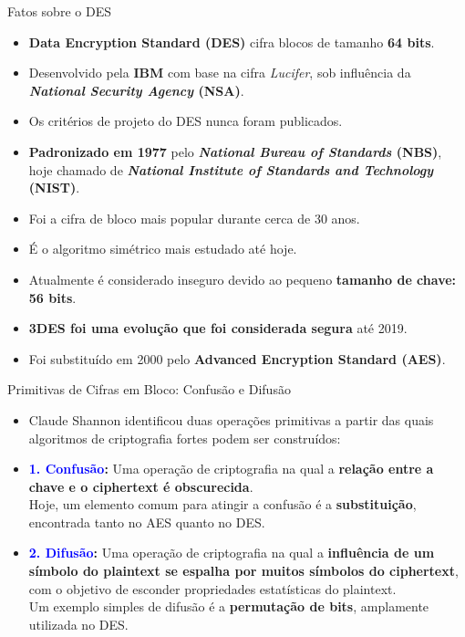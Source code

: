 \documentclass{beamer}
\begin{document}
\begin{frame}{Fatos sobre o DES}

\begin{itemize}
    \item \textbf{Data Encryption Standard (DES)} cifra blocos de tamanho \textbf{64 bits}.
    \item Desenvolvido pela \textbf{IBM} com base na cifra \textit{Lucifer}, sob influência da \textbf{\textit{National Security Agency} (NSA)}. 
    \item Os critérios de projeto do DES nunca foram publicados.
    \item \textbf{Padronizado em 1977} pelo \textbf{\textit{National Bureau of Standards} (NBS)}, hoje chamado de \textbf{\textit{National Institute of Standards and Technology} (NIST)}.
    \item Foi a cifra de bloco mais popular durante cerca de 30 anos.
    \item É o algoritmo simétrico mais estudado até hoje.
    \item Atualmente é considerado inseguro devido ao pequeno \textbf{tamanho de chave: 56 bits}.
    \item \textbf{3DES foi uma evolução que foi considerada segura} até 2019.
    \item Foi substituído em 2000 pelo \textbf{Advanced Encryption Standard (AES)}.
\end{itemize}

\end{frame}


\begin{frame}{Primitivas de Cifras em Bloco: Confusão e Difusão}

\begin{itemize}
    \item Claude Shannon identificou duas operações primitivas a partir das quais algoritmos de criptografia fortes podem ser construídos:
    
    \vspace{1em}
    \item
    \textbf{\textcolor{blue}{1. Confusão}:} Uma operação de criptografia na qual a \textbf{relação entre a chave e o ciphertext é obscurecida}.\\
    Hoje, um elemento comum para atingir a confusão é a \textbf{substituição}, encontrada tanto no AES quanto no DES.
    
    \vspace{1em}
    \item
    \textbf{\textcolor{blue}{2. Difusão}:} Uma operação de criptografia na qual a \textbf{influência de um símbolo do plaintext se espalha por muitos símbolos do ciphertext}, com o objetivo de esconder propriedades estatísticas do plaintext.\\
    Um exemplo simples de difusão é a \textbf{permutação de bits}, amplamente utilizada no DES.
\end{itemize}

\end{frame}
\end{document}
